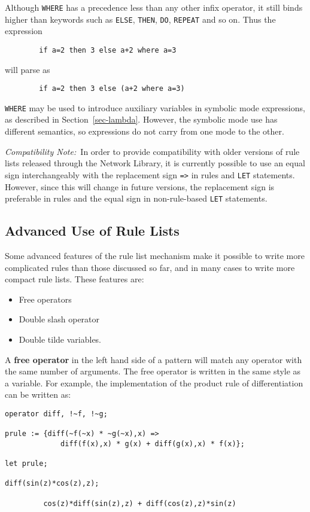 \documentclass[11pt,letterpaper]{book}
\newcommand{\COMPATNOTE}{{\em Compatibility Note:\ }}
\begin{document}
Although {\tt WHERE} has a precedence less than any other infix operator,
it still binds higher than keywords such as {\tt ELSE}, {\tt THEN},
{\tt DO}, {\tt REPEAT} and so on.  Thus the expression
{\small\begin{verbatim}
        if a=2 then 3 else a+2 where a=3
\end{verbatim}}
will parse as
{\small\begin{verbatim}
        if a=2 then 3 else (a+2 where a=3)
\end{verbatim}}

{\tt WHERE} may be used to introduce auxiliary variables in symbolic mode
expressions, as described in Section~\ref{sec-lambda}.  However, the
symbolic mode use has different semantics, so expressions do not carry
from one mode to the other.

\COMPATNOTE In order to provide compatibility with older versions of rule
lists released through the Network Library, it is currently possible to use
an equal sign interchangeably with the replacement sign {\tt =>} in rules
and {\tt LET} statements.  However, since this will change in future
versions, the replacement sign is preferable in rules and the equal sign
in non-rule-based {\tt LET} statements.

\subsection*{Advanced Use of Rule Lists}

Some advanced features of the rule list mechanism make it possible to
write more complicated rules than those discussed so far, and in many
cases to write more compact rule lists.  These features are:

\begin{itemize}
\item Free operators
\item Double slash operator
\item Double tilde variables.
\end{itemize}
A {\bf free operator} in the left hand side of a pattern will match any
operator with the same number of arguments.  The free operator is written
in the same style as a variable.  For example, the implementation of the
product rule of differentiation can be written as:
{\small\begin{verbatim}
operator diff, !~f, !~g;

prule := {diff(~f(~x) * ~g(~x),x) =>
             diff(f(x),x) * g(x) + diff(g(x),x) * f(x)};

let prule;

diff(sin(z)*cos(z),z);

         cos(z)*diff(sin(z),z) + diff(cos(z),z)*sin(z)
\end{verbatim}}
\end{document}
